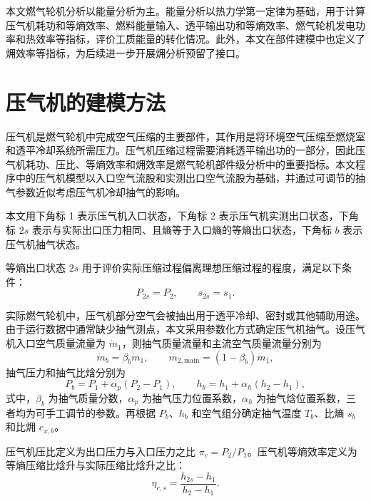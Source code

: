 本文燃气轮机分析以能量分析为主。能量分析以热力学第一定律为基础，用于计算压气机耗功和等熵效率、燃料能量输入、透平输出功和等熵效率、燃气轮机发电功率和热效率等指标，评价工质能量的转化情况。此外，本文在部件建模中也定义了㶲效率等指标，为后续进一步开展㶲分析预留了接口。

\section{压气机的建模方法}

压气机是燃气轮机中完成空气压缩的主要部件，其作用是将环境空气压缩至燃烧室和透平冷却系统所需压力。压气机压缩过程需要消耗透平输出功的一部分，因此压气机耗功、压比、等熵效率和㶲效率是燃气轮机部件级分析中的重要指标。本文程序中的压气机模型以入口空气流股和实测出口空气流股为基础，并通过可调节的抽气参数近似考虑压气机冷却抽气的影响。

本文用下角标 1 表示压气机入口状态，下角标 2 表示压气机实测出口状态，下角标 $2s$ 表示与实际出口压力相同、且熵等于入口熵的等熵出口状态，下角标 $b$ 表示压气机抽气状态。

等熵出口状态 $2s$ 用于评价实际压缩过程偏离理想压缩过程的程度，满足以下条件：
\begin{equation}\label{eq:compressor-isentropic-state}
P_{2s}=P_2,
\qquad
s_{2s}=s_1.
\end{equation}

实际燃气轮机中，压气机部分空气会被抽出用于透平冷却、密封或其他辅助用途。由于运行数据中通常缺少抽气测点，本文采用参数化方式确定压气机抽气。设压气机入口空气质量流量为 $\dot{m}_1$，则抽气质量流量和主流空气质量流量分别为
\begin{equation}\label{eq:bleed-mass-flow}
\dot{m}_b = \beta_b \dot{m}_1,
\qquad
\dot{m}_{2,\mathrm{main}} = \left(1-\beta_b\right)\dot{m}_1,
\end{equation}
抽气压力和抽气比焓分别为
\begin{equation}\label{eq:bleed-state}
P_b = P_1 + \alpha_p\left(P_2-P_1\right),
\qquad
h_b = h_1 + \alpha_h\left(h_2-h_1\right),
\end{equation}
式中，$\beta_b$ 为抽气质量分数，$\alpha_p$ 为抽气压力位置系数，$\alpha_h$ 为抽气焓位置系数，三者均为可手工调节的参数。再根据 $P_b$、$h_b$ 和空气组分确定抽气温度 $T_b$、比熵 $s_b$ 和比㶲 $e_{x,b}$。

压气机压比定义为出口压力与入口压力之比 $\pi_c = P_2/P_1$。压气机等熵效率定义为等熵压缩比焓升与实际压缩比焓升之比：
\begin{equation}\label{eq:compressor-isentropic-eff}
\eta_{c,s}
=
\frac{h_{2s}-h_1}{h_2-h_1}.
\end{equation}

